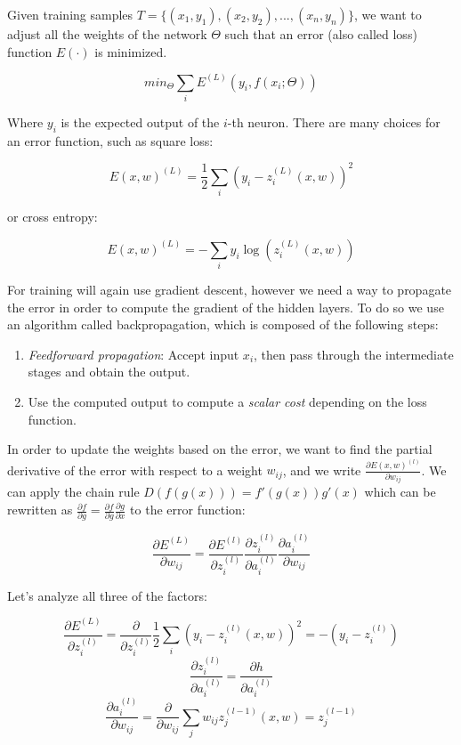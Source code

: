 \documentclass{article}
\begin{document}
Given training samples
\(T=\{ (x_1, y_1), (x_2, y_2), ..., (x_n, y_n) \}\), we want to adjust
all the weights of the network \(\Theta\) such that an error (also
called loss) function \(E(\cdot)\) is minimized.

\[min_{\Theta} \sum _i E^{(L)}(y_i, f(x_i;\Theta))\]

Where \(y_i\) is the expected output of the \(i\)-th neuron. There are
many choices for an error function, such as square loss:

\[E(x, w)^{(L)}=\frac{1}{2}\sum_i (y_i-z_i^{(L)}(x, w))^2\]

or cross entropy:

\[E(x, w)^{(L)} = -\sum_i y_i \log(z_i^{(L)}(x, w))\]

For training will again use gradient descent, however we need a way to
propagate the error in order to compute the gradient of the hidden
layers. To do so we use an algorithm called backpropagation, which is
composed of the following steps:

\begin{enumerate}
\def\labelenumi{\arabic{enumi}.}
\tightlist
\item
  \emph{Feedforward propagation}: Accept input \(x_i\), then pass
  through the intermediate stages and obtain the output.
\item
  Use the computed output to compute a \emph{scalar cost} depending on
  the loss function.
\end{enumerate}

In order to update the weights based on the error, we want to find the
partial derivative of the error with respect to a weight \(w_{ij}\), and
we write \(\frac{\partial E(x, w)^{(l)}}{\partial w_{ij}}\). We can
apply the chain rule \(D(f(g(x)))=f'(g(x))g'(x)\) which can be rewritten
as
\(\frac{\partial f}{\partial g}=\frac{\partial f}{\partial g}\frac{\partial g}{\partial x}\)
to the error function:

\[\frac{\partial E^{(L)}}{\partial w_{ij}}=\frac{\partial E^{(l)}}{\partial z_i^{(l)}}\frac{\partial z_i^{(l)}}{\partial a_i^{(l)}}\frac{\partial a_i^{(l)}}{\partial w_{ij}}\]

Let's analyze all three of the factors:

\[\frac{\partial E^{(L)}}{\partial z_i^{(l)}}=\frac{\partial}{\partial z_i^{(l)}}\frac{1}{2}\sum_i (y_i-z_i^{(l)}(x, w))^2=-(y_i-z_i^{(l)})\]
\[\frac{\partial z_i^{(l)}}{\partial a_i^{(l)}}=\frac{\partial h}{\partial a_i^{(l)}}\]
\[\frac{\partial a_i^{(l)}}{\partial w_{ij}}=\frac{\partial}{\partial w_{ij}}\sum_j w_{ij}z_j^{(l-1)}(x, w)=z_j^{(l-1)}\]
\end{document}
